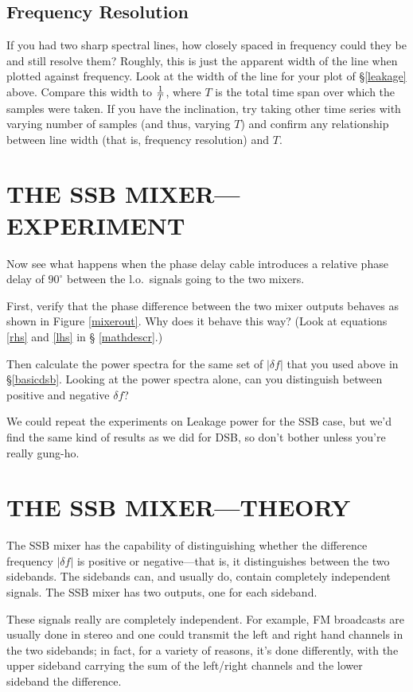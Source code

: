 \documentclass[11pt,preprint]{aastex}
\begin{document}
\subsection{Frequency Resolution}

If you had two sharp spectral lines, how closely spaced in frequency
could they be and still resolve them? Roughly, this is just the apparent
width of the line when plotted against frequency. Look at the width of
the line for your plot of \S \ref{leakage} above. Compare this width to
$1 \over T$, where $T$ is the total time span over which the samples
were taken. If you have the inclination, try taking other time series
with varying number of samples (and thus, varying $T$) and confirm any
relationship between line width (that is, frequency resolution) and
$T$. 


\section{THE SSB MIXER---EXPERIMENT}

Now see what happens when the phase delay cable introduces a relative
phase delay of $90^\circ$ between the l.o.\ signals going to the two
mixers. 

First, verify that the phase difference between the two mixer outputs
behaves as shown in Figure \ref{mixerout}. Why does it behave this way?
(Look at equations \ref{rhs} and \ref{lhs} in \S
\ref{mathdescr}.)

Then calculate the power spectra for the same set of $|\delta f|$
that you used above in \S \ref{basicdsb}. Looking at the power spectra
alone, can you distinguish between positive and negative $\delta f$?

We could repeat the experiments on Leakage power for the SSB case, but
we'd find the same kind of results as we did for DSB, so don't bother
unless you're really gung-ho.

\section{THE SSB MIXER---THEORY}

The SSB mixer has the capability of distinguishing whether the
difference frequency $|\delta f|$ is positive or negative---that
is, it distinguishes between the two sidebands.  The sidebands can, and
usually do, contain completely independent signals. The SSB mixer has
two outputs, one for each sideband.

        These signals really are completely independent. For example, FM
broadcasts are usually done in stereo and one could transmit the left
and right hand channels in the two sidebands; in fact, for a variety of
reasons, it's done differently, with the upper sideband carrying the sum
of the left/right channels and the lower sideband the difference.
\end{document}
